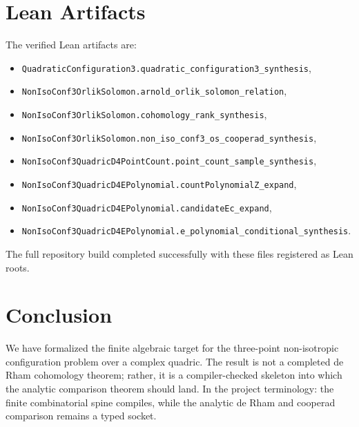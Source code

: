 \documentclass[11pt]{article}
\begin{document}
\section{Lean Artifacts}
The verified Lean artifacts are:
\begin{itemize}[leftmargin=2em]
\item \texttt{QuadraticConfiguration3.quadratic\_configuration3\_synthesis},
\item \texttt{NonIsoConf3OrlikSolomon.arnold\_orlik\_solomon\_relation},
\item \texttt{NonIsoConf3OrlikSolomon.cohomology\_rank\_synthesis},
\item \texttt{NonIsoConf3OrlikSolomon.non\_iso\_conf3\_os\_cooperad\_synthesis},
\item \texttt{NonIsoConf3QuadricD4PointCount.point\_count\_sample\_synthesis},
\item \texttt{NonIsoConf3QuadricD4EPolynomial.countPolynomialZ\_expand},
\item \texttt{NonIsoConf3QuadricD4EPolynomial.candidateEc\_expand},
\item \texttt{NonIsoConf3QuadricD4EPolynomial.e\_polynomial\_conditional\_synthesis}.
\end{itemize}

The full repository build completed successfully with these files registered as Lean roots.

\section*{Conclusion}
We have formalized the finite algebraic target for the three-point non-isotropic configuration problem over a complex quadric.  The result is not a completed de Rham cohomology theorem; rather, it is a compiler-checked skeleton into which the analytic comparison theorem should land.  In the project terminology: the finite combinatorial spine compiles, while the analytic de Rham and cooperad comparison remains a typed socket.
\end{document}
